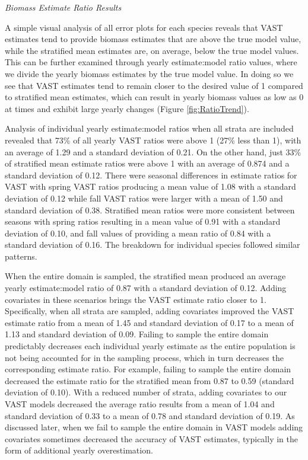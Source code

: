 \documentclass[
  12pt,
]{article}
\begin{document}
\emph{Biomass Estimate Ratio Results}

A simple visual analysis of all error plots for each species reveals that VAST estimates tend to provide biomass estimates that are above the true model value, while the stratified mean estimates are, on average, below the true model values. This can be further examined through yearly estimate:model ratio values, where we divide the yearly biomass estimates by the true model value. In doing so we see that VAST estimates tend to remain closer to the desired value of 1 compared to stratified mean estimates, which can result in yearly biomass values as low as 0 at times and exhibit large yearly changes (Figure \ref{fig:RatioTrend}).

Analysis of individual yearly estimate:model ratios when all strata are included revealed that 73\% of all yearly VAST ratios were above 1 (27\% less than 1), with an average of 1.29 and a standard deviation of 0.21. On the other hand, just 33\% of stratified mean estimate ratios were above 1 with an average of 0.874 and a standard deviation of 0.12. There were seasonal differences in estimate ratios for VAST with spring VAST ratios producing a mean value of 1.08 with a standard deviation of 0.12 while fall VAST ratios were larger with a mean of 1.50 and standard deviation of 0.38. Stratified mean ratios were more consistent between seasons with spring ratios resulting in a mean value of 0.91 with a standard deviation of 0.10, and fall values of providing a mean ratio of 0.84 with a standard deviation of 0.16. The breakdown for individual species followed similar patterns.

When the entire domain is sampled, the stratified mean produced an average yearly estimate:model ratio of 0.87 with a standard deviation of 0.12. Adding covariates in these scenarios brings the VAST estimate ratio closer to 1. Specifically, when all strata are sampled, adding covariates improved the VAST estimate ratio from a mean of 1.45 and standard deviation of 0.17 to a mean of 1.13 and standard deviation of 0.09. Failing to sample the entire domain predictably decreases each individual yearly estimate as the entire population is not being accounted for in the sampling process, which in turn decreases the corresponding estimate ratio. For example, failing to sample the entire domain decreased the estimate ratio for the stratified mean from 0.87 to 0.59 (standard deviation of 0.10). With a reduced number of strata, adding covariates to our VAST models decreased the average ratio results from a mean of 1.04 and standard deviation of 0.33 to a mean of 0.78 and standard deviation of 0.19. As discussed later, when we fail to sample the entire domain in VAST models adding covariates sometimes decreased the accuracy of VAST estimates, typically in the form of additional yearly overestimation.
\end{document}
